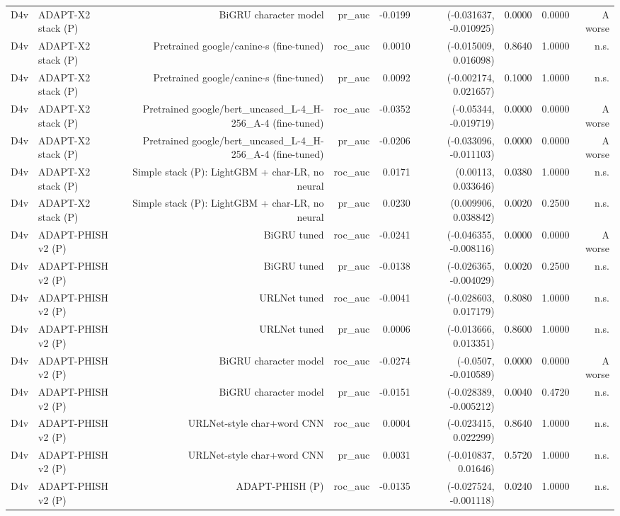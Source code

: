 \begin{table}[t]
\begin{tabular}{llrrrrrrr}
D4v & ADAPT-X2 stack (P) & BiGRU character model & pr\_auc & -0.0199 & (-0.031637, -0.010925) & 0.0000 & 0.0000 & A worse \\
D4v & ADAPT-X2 stack (P) & Pretrained google/canine-s (fine-tuned) & roc\_auc & 0.0010 & (-0.015009, 0.016098) & 0.8640 & 1.0000 & n.s. \\
D4v & ADAPT-X2 stack (P) & Pretrained google/canine-s (fine-tuned) & pr\_auc & 0.0092 & (-0.002174, 0.021657) & 0.1000 & 1.0000 & n.s. \\
D4v & ADAPT-X2 stack (P) & Pretrained google/bert\_uncased\_L-4\_H-256\_A-4 (fine-tuned) & roc\_auc & -0.0352 & (-0.05344, -0.019719) & 0.0000 & 0.0000 & A worse \\
D4v & ADAPT-X2 stack (P) & Pretrained google/bert\_uncased\_L-4\_H-256\_A-4 (fine-tuned) & pr\_auc & -0.0206 & (-0.033096, -0.011103) & 0.0000 & 0.0000 & A worse \\
D4v & ADAPT-X2 stack (P) & Simple stack (P): LightGBM + char-LR, no neural & roc\_auc & 0.0171 & (0.00113, 0.033646) & 0.0380 & 1.0000 & n.s. \\
D4v & ADAPT-X2 stack (P) & Simple stack (P): LightGBM + char-LR, no neural & pr\_auc & 0.0230 & (0.009906, 0.038842) & 0.0020 & 0.2500 & n.s. \\
D4v & ADAPT-PHISH v2 (P) & BiGRU tuned & roc\_auc & -0.0241 & (-0.046355, -0.008116) & 0.0000 & 0.0000 & A worse \\
D4v & ADAPT-PHISH v2 (P) & BiGRU tuned & pr\_auc & -0.0138 & (-0.026365, -0.004029) & 0.0020 & 0.2500 & n.s. \\
D4v & ADAPT-PHISH v2 (P) & URLNet tuned & roc\_auc & -0.0041 & (-0.028603, 0.017179) & 0.8080 & 1.0000 & n.s. \\
D4v & ADAPT-PHISH v2 (P) & URLNet tuned & pr\_auc & 0.0006 & (-0.013666, 0.013351) & 0.8600 & 1.0000 & n.s. \\
D4v & ADAPT-PHISH v2 (P) & BiGRU character model & roc\_auc & -0.0274 & (-0.0507, -0.010589) & 0.0000 & 0.0000 & A worse \\
D4v & ADAPT-PHISH v2 (P) & BiGRU character model & pr\_auc & -0.0151 & (-0.028389, -0.005212) & 0.0040 & 0.4720 & n.s. \\
D4v & ADAPT-PHISH v2 (P) & URLNet-style char+word CNN & roc\_auc & 0.0004 & (-0.023415, 0.022299) & 0.8640 & 1.0000 & n.s. \\
D4v & ADAPT-PHISH v2 (P) & URLNet-style char+word CNN & pr\_auc & 0.0031 & (-0.010837, 0.01646) & 0.5720 & 1.0000 & n.s. \\
D4v & ADAPT-PHISH v2 (P) & ADAPT-PHISH (P) & roc\_auc & -0.0135 & (-0.027524, -0.001118) & 0.0240 & 1.0000 & n.s. \\

\end{tabular}
\end{table}
